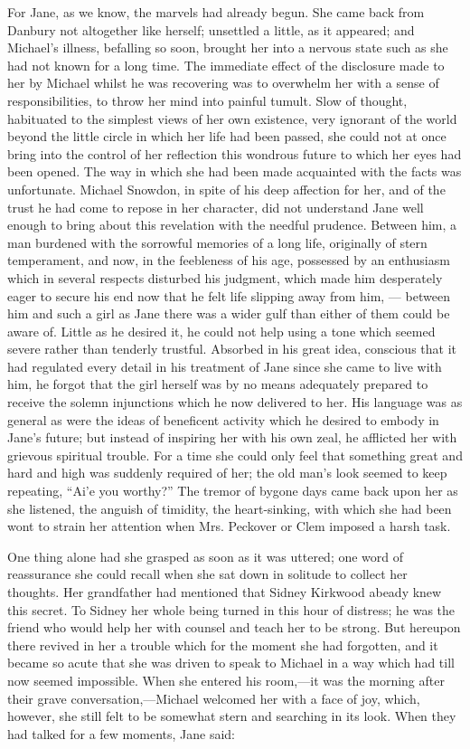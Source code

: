 For Jane, as we know, the marvels had
{\protect\hypertarget{247}{}{}}already begun. She came back from Danbury
not altogether like herself; unsettled a little, as it appeared; and
Michael's illness, befalling so soon, brought her into a nervous state
such as she had not known for a long time. The immediate effect of the
disclosure made to her by Michael whilst he was recovering was to
overwhelm her with a sense of responsibilities, to throw her mind into
painful tumult. Slow of thought, habituated to the simplest views of her
own existence, very ignorant of the world beyond the little circle in
which her life had been passed, she could not at once bring into the
control of her reflection this wondrous future to which her eyes had
been opened. The way in which she had been made acquainted with the
facts was unfortunate. Michael Snowdon, in spite of his deep affection
for her, and of the trust he had come to repose in her character, did
not understand Jane well enough to bring about this revelation with the
needful prudence. Between him, a man burdened with the sorrowful
memories of a long life, originally of stern
{\protect\hypertarget{248}{}{}}temperament, and now, in the feebleness
of his age, possessed by an enthusiasm which in several respects
disturbed his judgment, which made him desperately eager to secure his
end now that he felt life slipping away from him, --- between him and
such a girl as Jane there was a wider gulf than either of them could be
aware of. Little as he desired it, he could not help using a tone which
seemed severe rather than tenderly trustful. Absorbed in his great idea,
conscious that it had regulated every detail in his treatment of Jane
since she came to live with him, he forgot that the girl herself was by
no means adequately prepared to receive the solemn injunctions which he
now delivered to her. His language was as general as were the ideas of
beneficent activity which he desired to embody in Jane's future; but
instead of inspiring her with his own zeal, he afflicted her with
grievous spiritual trouble. For a time she could only feel that
something great and hard and high was suddenly required of her; the old
man's look seemed to keep repeating, ``Ai'e you worthy?''
{\protect\hypertarget{249}{}{}}The tremor of bygone days came back upon
her as she listened, the anguish of timidity, the heart-sinking, with
which she had been wont to strain her attention when Mrs. Peckover or
Clem imposed a harsh task.

One thing alone had she grasped as soon as it was uttered; one word of
reassurance she could recall when she sat down in solitude to collect
her thoughts. Her grandfather had mentioned that Sidney Kirkwood abeady
knew this secret. To Sidney her whole being turned in this hour of
distress; he was the friend who would help her with counsel and teach
her to be strong. But hereupon there revived in her a trouble which for
the moment she had forgotten, and it became so acute that she was driven
to speak to Michael in a way which had till now seemed impossible. When
she entered his room,---it was the morning after their grave
conversation,---Michael welcomed her with a face of joy, which, however,
she still felt to be somewhat stern and searching in its look. When they
had talked for a few moments, Jane said:

